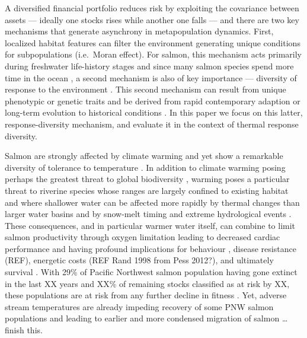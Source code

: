 A diversified financial portfolio reduces risk by exploiting the covariance between assets --- ideally one stocks rises while another one falls --- and there are two key mechanisms that generate asynchrony in metapopulation dynamics. First, localized habitat features can filter the environment generating unique conditions for subpopulations \citep{schindler2008} (i.e.~Moran effect). For salmon, this mechanism acts primarily during freshwater life-history stages and since many salmon species spend more time in the ocean \citep{quinn2005}, a second mechanism is also of key importance --- diversity of response to the environment \citetext{\citealp[i.e.~response diversity,][]{elmqvist2003}; \citealp[and biocomplexity][]{colwell1998}; \citealp{hilborn2003}}. This second mechanism can result from unique phenotypic or genetic traits \citep{crozier2008, kovach2012} and be derived from rapid contemporary adaption \citep{stockwell2003, fraser2011} or long-term evolution to historical conditions \citep{eliason2011}. In this paper we focus on this latter, response-diversity mechanism, and evaluate it in the context of thermal response diversity.

Salmon are strongly affected by climate warming and yet show a remarkable diversity of tolerance to temperature \citep{beacham1989, crozier2006, battin2007, crozier2008}. In addition to climate warming posing perhaps the greatest threat to global biodiversity \citep{thomas2004}, warming poses a particular threat to riverine species whose ranges are largely confined to existing habitat \citep{thomas2010} and where shallower water can be affected more rapidly by thermal changes than larger water basins \citep{isaak2010} and by snow-melt timing and extreme hydrological events \citep{crozier2008}. These consequences, and in particular warmer water itself, can combine to limit salmon productivity through oxygen limitation \citep{portner2007} leading to decreased cardiac performance \citep{eliason2011} and having profound implications for behaviour \citep{goniea2006}, disease resistance (REF), energetic costs (REF Rand 1998 from Pess 2012?), and ultimately survival \citep{peterman1998, eliason2011}. With 29\% of Pacific Northwest salmon population having gone extinct in the last XX years and XX\% of remaining stocks classified as at risk by XX, these populations are at risk from any further decline in fitness \citep{crozier2008, mcclure2003}. Yet, adverse stream temperatures are already impeding recovery of some PNW salmon populations \citep{mccullough1999} and leading to earlier and more condensed migration of salmon \citep{kovach2013a}\ldots{} finish this.

